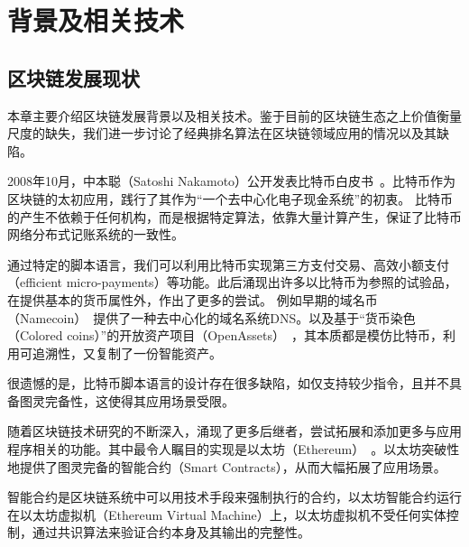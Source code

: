 
\section{背景及相关技术}




\subsection{区块链发展现状}
本章主要介绍区块链发展背景以及相关技术。鉴于目前的区块链生态之上价值衡量尺度的缺失，我们进一步讨论了经典排名算法在区块链领域应用的情况以及其缺陷。

2008年10月，中本聪（Satoshi Nakamoto）公开发表比特币白皮书~\cite{Nakamoto2008}。比特币作为区块链的太初应用，践行了其作为“一个去中心化电子现金系统”的初衷。 比特币的产生不依赖于任何机构，而是根据特定算法，依靠大量计算产生，保证了比特币网络分布式记账系统的一致性。

通过特定的脚本语言，我们可以利用比特币实现第三方支付交易、高效小额支付（efficient micro-payments）等功能。此后涌现出许多以比特币为参照的试验品，在提供基本的货币属性外，作出了更多的尝试。
例如早期的域名币（Namecoin）~\cite{Namecoin}提供了一种去中心化的域名系统DNS。以及基于“货币染色（Colored coins）”的开放资产项目（OpenAssets）~\cite{OpenAssets}，其本质都是模仿比特币，利用可追溯性，又复制了一份智能资产。


很遗憾的是，比特币脚本语言的设计存在很多缺陷，如仅支持较少指令，且并不具备图灵完备性，这使得其应用场景受限。

随着区块链技术研究的不断深入，涌现了更多后继者，尝试拓展和添加更多与应用程序相关的功能。其中最令人瞩目的实现是以太坊（Ethereum）~\cite{buterin2013ethereum}。以太坊突破性地提供了图灵完备的智能合约（Smart Contracts），从而大幅拓展了应用场景。

智能合约是区块链系统中可以用技术手段来强制执行的合约，以太坊智能合约运行在以太坊虚拟机（Ethereum Virtual Machine）上，以太坊虚拟机不受任何实体控制，通过共识算法来验证合约本身及其输出的完整性。

